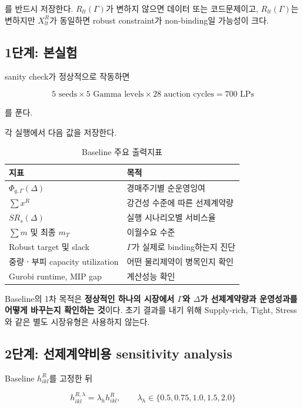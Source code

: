 \documentclass[11pt,a4paper]{article}
\begin{document}
를 반드시 저장한다.
$R_{lt}(\Gamma)$가 변하지 않으면 데이터 또는 코드문제이고,
$R_{lt}(\Gamma)$는 변하지만 $X^R_{lt}$가 동일하면 robust constraint가 non-binding일 가능성이 크다.

\subsection{1단계: 본실험}

sanity check가 정상적으로 작동하면

\[
5\text{ seeds}\times5\text{ Gamma levels}\times28\text{ auction cycles}
=
700\text{ LPs}
\]

를 푼다.

각 실행에서 다음 값을 저장한다.

\begin{table}[h!]
\centering
\caption{Baseline 주요 출력지표}
\begin{tabularx}{0.94\textwidth}{@{}p{}X@{}}
\toprule
\textbf{지표} & \textbf{목적} \\
\midrule
$\Phi_{q,\Gamma}(\Delta)$ & 경매주기별 순운영잉여 \\
$\sum x^R$ & 강건성 수준에 따른 선제계약량 \\
$SR_s(\Delta)$ & 실행 시나리오별 서비스율 \\
$\sum m$ 및 최종 $m_T$ & 이월수요 수준 \\
Robust target 및 slack & $\Gamma$가 실제로 binding하는지 진단 \\
중량ㆍ부피 capacity utilization & 어떤 물리제약이 병목인지 확인 \\
Gurobi runtime, MIP gap & 계산성능 확인 \\
\bottomrule
\end{tabularx}
\end{table}

Baseline의 1차 목적은
\textbf{정상적인 하나의 시장에서 $\Gamma$와 $\Delta$가 선제계약량과 운영성과를 어떻게 바꾸는지 확인하는 것}이다.
초기 결과를 내기 위해 Supply-rich, Tight, Stress와 같은 별도 시장유형은 사용하지 않는다.

\subsection{2단계: 선제계약비용 sensitivity analysis}

Baseline $h^R_{ikl}$를 고정한 뒤

\[
h^{R,\lambda}_{ikl}
=
\lambda_h h^R_{ikl},
\qquad
\lambda_h\in\{0.5,0.75,1.0,1.5,2.0\}
\]
\end{document}
